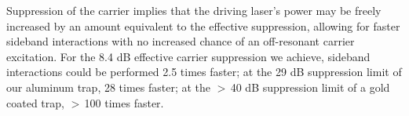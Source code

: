 Suppression of the carrier implies that the driving laser's power may be freely increased by an amount equivalent to the effective suppression, allowing for faster sideband interactions with no increased chance of an off-resonant carrier excitation. For the 8.4 dB effective carrier suppression we achieve, sideband interactions could be performed 2.5 times faster; at the 29 dB suppression limit of our aluminum trap, 28 times faster; at the $>\,$40 dB suppression limit of a gold coated trap, $>\,$100 times faster.